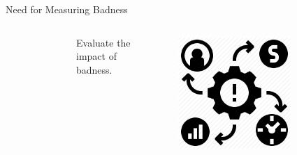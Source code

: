 \documentclass[nobackground,dvipsnames,table]{beamer}
\begin{document}
\begin{frame}{Need for Measuring Badness}
\begin{columns}[T]
\begin{figure}
            \end{figure}
            \centering
            Evaluate the impact of badness.\\
            \begin{figure}
                \includegraphics[width=0.75\textwidth]{impact-of-badness}
            \end{figure}
    \end{columns}
\end{frame}
\end{document}
